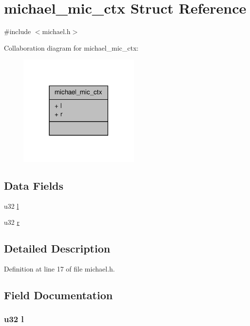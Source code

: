 \hypertarget{structmichael__mic__ctx}{\section{michael\-\_\-mic\-\_\-ctx Struct Reference}
\label{structmichael__mic__ctx}
}


{\ttfamily \#include $<$michael.\-h$>$}



Collaboration diagram for michael\-\_\-mic\-\_\-ctx\-:
\nopagebreak
\begin{figure}[H]
\begin{center}
\leavevmode
\includegraphics[width=170pt]{structmichael__mic__ctx__coll__graph}
\end{center}
\end{figure}
\subsection*{Data Fields}
\begin{DoxyCompactItemize}
\item 
u32 \hyperlink{structmichael__mic__ctx_a97b22435f07e68bf751cddd2226228ab}{l}
\item 
u32 \hyperlink{structmichael__mic__ctx_a4c24b5b7511b13fa815f1ef250c4d40a}{r}
\end{DoxyCompactItemize}


\subsection{Detailed Description}


Definition at line 17 of file michael.\-h.



\subsection{Field Documentation}
\hypertarget{structmichael__mic__ctx_a97b22435f07e68bf751cddd2226228ab}{
\subsubsection[{l}]{\setlength{\rightskip}{0pt plus 5cm}u32 l}}\label{structmichael__mic__ctx_a97b22435f07e68bf751cddd2226228ab}


